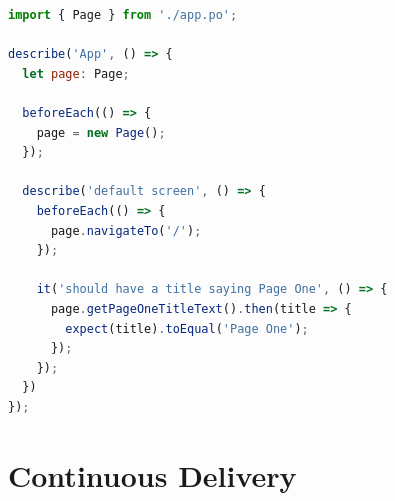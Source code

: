 \documentclass[12pt]{article}
\begin{document}
\begin{lstlisting}[language=javascript]
import { Page } from './app.po';

describe('App', () => {
  let page: Page;

  beforeEach(() => {
    page = new Page();
  });

  describe('default screen', () => {
    beforeEach(() => {
      page.navigateTo('/');
    });

    it('should have a title saying Page One', () => {
      page.getPageOneTitleText().then(title => {
        expect(title).toEqual('Page One');
      });
    });
  })
});
\end{lstlisting}

\section{Continuous Delivery}\label{chap:cd}
\end{document}
